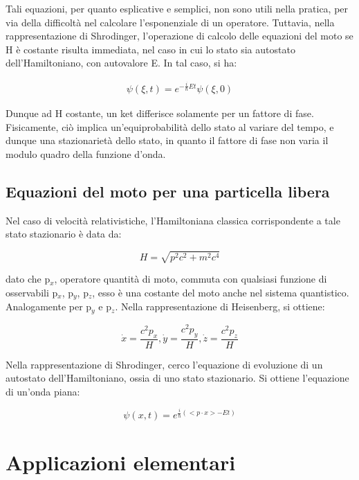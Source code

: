\documentclass{article}
\begin{document}
Tali equazioni, per quanto esplicative e semplici, non sono utili nella pratica, per via della difficoltà nel calcolare l'esponenziale di un operatore.
Tuttavia, nella rappresentazione di Shrodinger, l'operazione di calcolo delle equazioni del moto se H è costante risulta immediata, nel caso in cui
lo stato sia autostato dell'Hamiltoniano, con autovalore E. In tal caso, si ha:

\begin{equation}
    \begin{aligned}
    \psi(\xi,t)=e^{-\frac{i}{\hbar}Et}\psi(\xi,0)
    \end{aligned}
\end{equation}

Dunque ad H costante, un ket differisce solamente per un fattore di fase.
Fisicamente, ciò implica un'equiprobabilità dello stato al variare del tempo, e dunque una stazionarietà dello stato, in quanto il fattore di fase non varia il modulo quadro della funzione d'onda.

\subsection{Equazioni del moto per una particella libera}
Nel caso di velocità relativistiche, l'Hamiltoniana classica corrispondente a tale stato stazionario è data da:

\begin{equation}
    H= \sqrt{p^2c^2+m^2c^4}
\end{equation}

dato che p$_x$, operatore quantità di moto, commuta con qualsiasi funzione di osservabili p$_x$, p$_y$, p$_z$, esso è  una costante del moto
anche nel sistema quantistico. Analogamente per p$_y$ e p$_z$.
Nella rappresentazione di Heisenberg, si ottiene:

\begin{equation}
    \dot{x}=\frac{c^2 p_x}{H}, \dot{y}=\frac{c^2 p_y}{H}, \dot{z}=\frac{c^2 p_z}{H}
\end{equation}

Nella rappresentazione di Shrodinger, cerco l'equazione di evoluzione di un autostato dell'Hamiltoniano, ossia di uno stato stazionario.
Si ottiene l'equazione di un'onda piana:

\begin{equation}
    \psi(x,t)=e^{\frac{i}{\hbar}(<p\cdot x>-Et)}
\end{equation}

\section{Applicazioni elementari}
\end{document}
